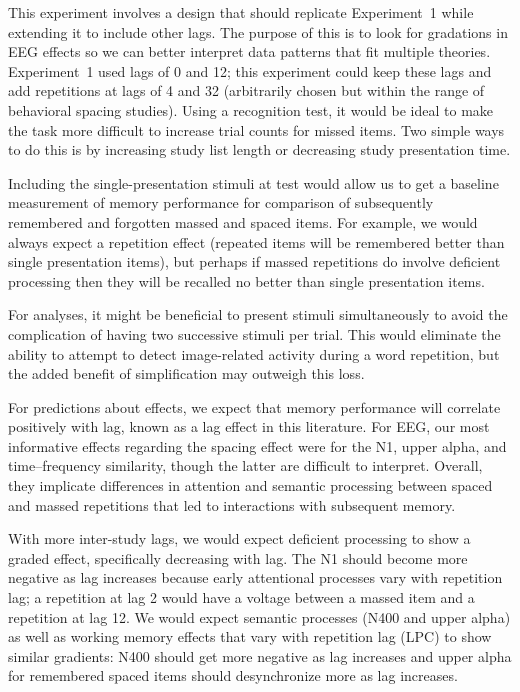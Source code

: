 This experiment involves a design that should replicate Experiment~1 while extending it to include other lags.  The purpose of this is to look for gradations in EEG effects so we can better interpret data patterns that fit multiple theories.  Experiment~1 used lags of 0 and 12; this experiment could keep these lags and add repetitions at lags of 4 and 32 (arbitrarily chosen but within the range of behavioral spacing studies).  Using a recognition test, it would be ideal to make the task more difficult to increase trial counts for missed items.  Two simple ways to do this is by increasing study list length or decreasing study presentation time.

Including the single-presentation stimuli at test would allow us to get a baseline measurement of memory performance for comparison of subsequently remembered and forgotten massed and spaced items.  For example, we would always expect a repetition effect (repeated items will be remembered better than single presentation items), but perhaps if massed repetitions do involve deficient processing then they will be recalled no better than single presentation items.

For analyses, it might be beneficial to present stimuli simultaneously to avoid the complication of having two successive stimuli per trial.  This would eliminate the ability to attempt to detect image-related activity during a word repetition, but the added benefit of simplification may outweigh this loss.

For predictions about effects, we expect that memory performance will correlate positively with lag, known as a lag effect in this literature.  For EEG, our most informative effects regarding the spacing effect were for the N1, upper alpha, and time--frequency similarity, though the latter are difficult to interpret.  Overall, they implicate differences in attention and semantic processing between spaced and massed repetitions that led to interactions with subsequent memory.

With more inter-study lags, we would expect deficient processing to show a graded effect, specifically decreasing with lag.  The N1 should become more negative as lag increases because early attentional processes vary with repetition lag; a repetition at lag 2 would have a voltage between a massed item and a repetition at lag 12.  We would expect semantic processes (N400 and upper alpha) as well as working memory effects that vary with repetition lag (LPC) to show similar gradients: N400 should get more negative as lag increases and upper alpha for remembered spaced items should desynchronize more as lag increases.

